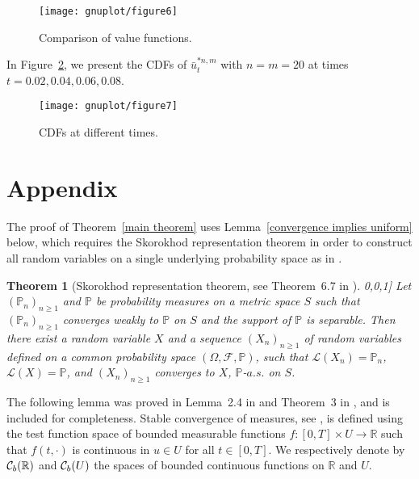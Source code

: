 \documentclass[12pt]{article}
\newtheorem{theorem}[prop]{Theorem}
\theoremstyle{named}
\numberwithin{equation}{section}
\def\P{{\mathord{\mathbb P}}}
\newcommand{\real}{\mathbb{R}}
\let\oldcitet=\citet
\renewcommand{\cite}[1]{\textcolor[rgb]{0,0,1}{\oldcitet{#1}}}
\renewcommand{\citet}[1]{\textcolor[rgb]{0,0,1}{\oldcitet{#1}}}
\begin{document}
\begin{figure}[H]
\centering
   \texttt{[image: gnuplot/figure6]}
   \caption{Comparison of value functions.}
   \label{fig:quartic_value_func(a)}
\end{figure}

\noindent
In Figure~\ref{fig:quartic_cdf_diff_time}, we present the CDFs of
$\bar{u}^{*n,m}_t$
 with $n = m = 20$ at times $t = 0.02, 0.04, 0.06, 0.08$.

\begin{figure}[H]
  \centering
  \texttt{[image: gnuplot/figure7]}
  \caption{CDFs at different times.}
\label{fig:quartic_cdf_diff_time}
\end{figure}

\vskip-0.2cm
\appendix
\section{Appendix}
\noindent
The proof of Theorem~\ref{main theorem} uses Lemma~\ref{convergence implies uniform} below,
which requires the Skorokhod representation theorem
in order to construct all random variables on a single underlying probability space
as in \cite{kushner1990numerical}.
\begin{theorem}[Skorokhod representation theorem, see Theorem~6.7 in
     \cite{billingsley1999}]
  \label{skorohod theorem}
  Let $(\P_n)_{n \geq 1}$ and $\P$ be probability measures on a metric space $S$
  such that $( \P_n )_{n \geq 1}$ converges weakly to $\P$ on $S$ and
  the support of $\P$ is separable.
  Then there exist a random variable $X$ and a sequence $(X_n)_{n \geq 1}$ of random variables defined on a common probability space $(\Omega, \mathcal{F}, \P ) $, such that $\mathcal{L}(X_n) = \P_n $, $\mathcal{L}(X) = \P $, and $(X_n)_{n\geq 1}$ converges
  to $X$, $\P$-$a.s.$ on $S$.
\end{theorem}
\noindent
The following lemma was proved in
Lemma~2.4 in \cite{jacodmemin}
and Theorem~3 in \cite{valadier1994course},
and is included for completeness.
 Stable convergence of measures,
 see \cite{renyi1963},
 is defined using the test function space
 of bounded measurable functions
 $f:[0,T]\times U \to \mathbb{R}$
 such that $f(t,\cdot )$ is continuous in $u\in U$
 for all $t\in [0,T]$.
We respectively denote by ${\cal C}_b(\real )$ and
${\cal C}_b(U)$ the spaces of bounded continuous
functions on $\real$ and $U$.
\end{document}
